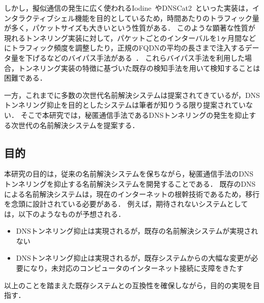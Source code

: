 しかし，擬似通信の発生に広く使われるIodine~\cite{iodine}やDNSCat2~\cite{dnscat2}といった実装は，インタラクティブシェル機能を目的としているため，時間あたりのトラフィック量が多く，パケットサイズも大きいという性質がある．
このような顕著な性質が現れるトンネリング実装に対して，パケットごとのインターバルを1ヶ月間などにトラフィック頻度を調整したり，正規のFQDNの平均の長さまで注入するデータ量を下げるなどのバイパス手法がある~\cite{asaf}．
これらバイパス手法を利用した場合，トンネリング実装の特徴に基づいた既存の検知手法を用いて検知することは困難である．

一方，これまでに多数の次世代名前解決システムは提案されてきているが，DNSトンネリング抑止を目的としたシステムは筆者が知りうる限り提案されていない．
そこで本研究では，秘匿通信手法であるDNSトンネリングの発生を抑止する次世代の名前解決システムを提案する．


\subsection{目的}
本研究の目的は，従来の名前解決システムを保ちながら，秘匿通信手法のDNSトンネリングを抑止する名前解決システムを開発することである．
既存のDNSによる名前解決システムは，現在のインターネットの根幹技術であるため，移行を念頭に設計されている必要がある．
例えば，期待されないシステムとしては，以下のようなものが予想される．
\begin{itemize}
 \setlength{\itemsep}{-0.5mm}
 \item DNSトンネリング抑止は実現されるが，既存の名前解決システムが実現されない
 \item DNSトンネリング抑止は実現されるが，既存システムからの大幅な変更が必要になり，未対応のコンピュータのインターネット接続に支障をきたす
\end{itemize}
以上のことを踏まえた既存システムとの互換性を確保しながら，目的の実現を目指す．

